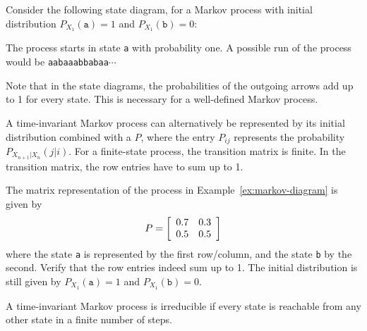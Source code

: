 \begin{example} \label{ex:markov-diagram}
Consider the following state diagram, for a Markov process with initial distribution $P_{X_1}(\texttt{a}) = 1$ and $P_{X_1}(\texttt{b}) = 0$:
\begin{center}
\end{center}
The process starts in state \texttt{a} with probability one. A possible run of the process would be \texttt{aabaaabbabaa}$\cdots$
\end{example}

Note that in the state diagrams, the probabilities of the outgoing arrows add up to 1 for every state. This is necessary for a well-defined Markov process.

A time-invariant Markov process can alternatively be represented by its initial distribution combined with a  $P$, where the entry $P_{ij}$ represents the probability $P_{X_{n+1}|X_{n}}(j|i)$. For a finite-state process, the transition matrix is finite. In the transition matrix, the row entries have to sum up to 1.

\begin{example}
The matrix representation of the process in Example~\ref{ex:markov-diagram} is given by
\[
P = \left[
\begin{array}{c c}
0.7&0.3\\
0.5&0.5
\end{array}
\right]
\]
where the state \texttt{a} is represented by the first row/column, and the state \texttt{b} by the second. Verify that the row entries indeed sum up to 1. The initial distribution is still given by $P_{X_1}(\texttt{a}) = 1$ and $P_{X_1}(\texttt{b}) = 0$.
\end{example}

\begin{definition}
A time-invariant Markov process is irreducible if every state is reachable from any other state in a finite number of steps.
\end{definition}

